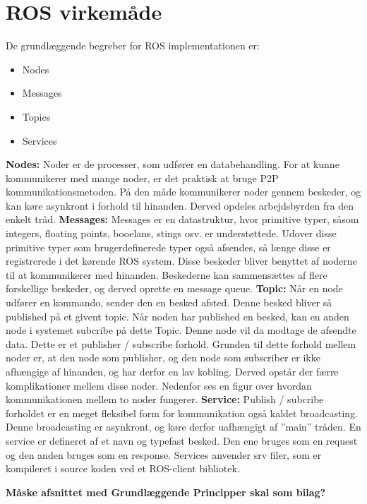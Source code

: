 \section{ROS virkemåde}
De grundlæggende begreber for ROS implementationen er:
\begin{itemize}  
\item Nodes
\item Messages
\item Topics
\item Services
\end{itemize}
\textbf{Nodes:} Noder er de processer, som udfører en databehandling. For at kunne kommunikerer med mange noder, er det praktisk at bruge P2P kommunikationsmetoden. På den måde kommunikerer noder gennem beskeder, og kan køre asynkront i forhold til hinanden. Derved opdeles arbejdsbyrden fra den enkelt tråd.\newline
\newline
\textbf{Messages:} Messages er en datastruktur, hvor primitive typer,  såsom integers, floating points, booelans, stings osv. er understøttede. Udover disse primitive typer som brugerdefinerede typer også afsendes, så længe disse er registrerede i det kørende ROS system. Disse beskeder bliver benyttet af noderne til at kommunikerer med hinanden. Beskederne kan sammensættes af flere forskellige beskeder, og derved oprette en message queue.\newline
\newline
\textbf{Topic:} Når en node udfører en kommando, sender den en besked afsted. Denne besked bliver så published på et givent topic. Når noden har published en besked, kan en anden node i systemet subcribe på dette Topic. Denne node vil da modtage de afsendte data. Dette er et publisher / subscribe forhold. Grunden til dette forhold mellem noder er, at den node som publisher, og den node som subscriber er ikke afhængige af hinanden, og har derfor en lav kobling. Derved opstår der færre komplikationer mellem disse noder.\newline
Nedenfor ses en figur over hvordan kommunikationen mellem to noder fungerer.
\textbf{Service:} Publish / subcribe forholdet er en meget fleksibel form for kommunikation også kaldet broadcasting. Denne broadcasting er asynkront, og køre derfor uafhængigt af ''main'' tråden. En service er defineret af et navn og typefast besked. Den ene bruges som en request og den anden bruges som en response. Services anvender srv filer, som er kompileret i source koden ved et ROS-client bibliotek.

\textbf{Måske afsnittet med Grundlæggende Principper skal som bilag?}
